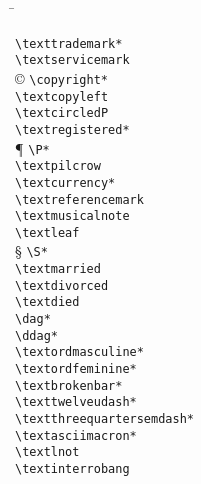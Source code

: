 %
\begin{multicols}{3}
\begin{tabbing}

\textpertenthousand \hspace{0.01cm} \= \kill %

\texttrademark 				\> \lstinline|\texttrademark*|\\
\textservicemark  		\> \lstinline|\textservicemark|\\
\copyright 						\> \lstinline|\copyright*|\\
\textcopyleft 				\> \lstinline|\textcopyleft|\\
\textcircledP 				\> \lstinline|\textcircledP|\\
\textregistered				\> \lstinline|\textregistered*|\\
\P										\> \lstinline|\P*|\\
\textpilcrow  				\> \lstinline|\textpilcrow|\\
\textcurrency					\> \lstinline|\textcurrency*|\\
\textreferencemark		\> \lstinline|\textreferencemark|\\
\textmusicalnote 			\> \lstinline|\textmusicalnote|\\
\textleaf 						\> \lstinline|\textleaf|\\
\S 										\> \lstinline|\S*|\\
\textmarried					\> \lstinline|\textmarried|\\
\textdivorced		 			\> \lstinline|\textdivorced|\\
\textdied							\> \lstinline|\textdied|\\
\dag									\> \lstinline|\dag*|\\
\ddag  								\> \lstinline|\ddag*|\\
\textordmasculine			\> \lstinline|\textordmasculine*|\\
\textordfeminine			\> \lstinline|\textordfeminine*|\\
\textbrokenbar				\> \lstinline|\textbrokenbar*|\\
\texttwelveudash	 		\> \lstinline|\texttwelveudash*|\\
\textthreequartersemdash	\> \lstinline|\textthreequartersemdash*|\\
\textasciimacron 			\> \lstinline|\textasciimacron*|\\
\textlnot							\> \lstinline|\textlnot|\\
\textinterrobang 			\> \lstinline|\textinterrobang|\\

\end{tabbing}
\end{multicols}
